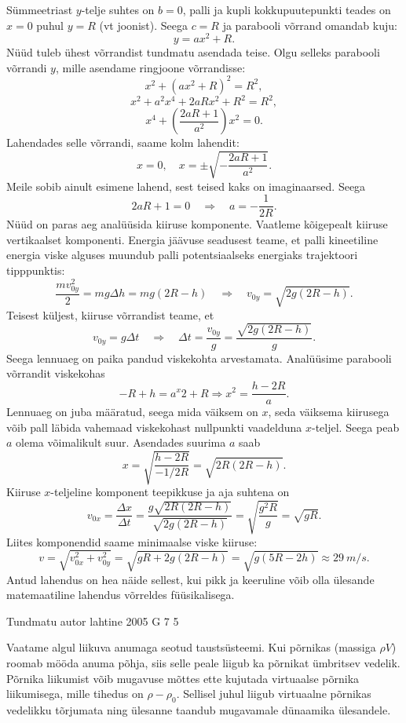 \documentclass[11pt, twoside]{article}
\begin{document}
{{Sümmeetriast $y$-telje suhtes on $b = 0$, palli ja kupli kokkupuutepunkti teades on $x = 0$ puhul $y = R$ (vt joonist). Seega $c = R$ ja parabooli võrrand omandab kuju:
\[
y = ax^2 + R.
\]
Nüüd tuleb ühest võrrandist tundmatu asendada teise. Olgu selleks parabooli võrrandi $y$, mille asendame ringjoone võrrandisse:
\[
x^{2}+\left(a x^{2}+R\right)^{2}=R^{2},
\]
\[
x^{2}+a^{2} x^{4}+2 a R x^{2}+R^{2}=R^{2},
\]
\[
x^{4}+\left(\frac{2 a R+1}{a^{2}}\right) x^{2}=0.
\]
Lahendades selle võrrandi, saame kolm lahendit:
\[
x=0, \quad x=\pm \sqrt{-\frac{2 a R+1}{a^{2}}}.
\]
Meile sobib ainult esimene lahend, sest teised kaks on imaginaarsed. Seega
\[
2aR + 1 = 0 \quad\Rightarrow\quad a = - \frac{1}{2R}.
\]
Nüüd on paras aeg analüüsida kiiruse komponente. Vaatleme kõigepealt kiiruse vertikaalset komponenti. Energia jäävuse seadusest teame, et palli kineetiline energia viske alguses muundub palli potentsiaalseks energiaks trajektoori tipppunktis:
\[
\frac{m v_{0 y}^{2}}{2}=m g \Delta h=m g(2 R-h) \quad\Rightarrow\quad v_{0 y}=\sqrt{2 g(2 R-h)}.
\]
Teisest küljest, kiiruse võrrandist teame, et
\[
v_{0 y}=g \Delta t \quad \Rightarrow \quad \Delta t=\frac{v_{0 y}}{g}=\frac{\sqrt{2 g(2 R-h)}}{g}.
\]
Seega lennuaeg on paika pandud viskekohta arvestamata. Analüüsime parabooli võrrandit viskekohas
\[
-R + h = a^x2 + R \Rightarrow x^2 = \frac{h-2R}{a}.
\]
Lennuaeg on juba määratud, seega mida väiksem on $x$, seda väiksema kiirusega võib pall läbida vahemaad viskekohast nullpunkti vaadelduna $x$-teljel. Seega peab $a$ olema võimalikult suur. Asendades suurima $a$ saab
\[
x=\sqrt{\frac{h-2 R}{-1 / 2 R}}=\sqrt{2 R(2 R-h)}.
\]
Kiiruse $x$-teljeline komponent teepikkuse ja aja suhtena on
\[
v_{0 x}=\frac{\Delta x}{\Delta t}=\frac{g \sqrt{2 R(2 R-h)}}{\sqrt{2 g(2 R-h)}}=\sqrt{\frac{g^{2} R}{g}}=\sqrt{g R}.
\]
Liites komponendid saame minimaalse viske kiiruse:
\[
v=\sqrt{v_{0 x}^{2}+v_{0 y}^{2}}=\sqrt{g R+2 g(2 R-h)}=\sqrt{g(5 R-2 h)} \approx \SI{29}{m/s}.
\]
Antud lahendus on hea näide sellest, kui pikk ja keeruline võib olla ülesande matemaatiline lahendus võrreldes füüsikalisega.
\fi
}

{Tundmatu autor} %
{lahtine} %
{2005} %
{G 7} %
{5} %
{

\ifSolution
Vaatame algul liikuva anumaga seotud taustsüsteemi. Kui põrnikas (massiga $\rho V$) roomab mööda anuma põhja, siis selle peale liigub ka põrnikat ümbritsev vedelik. Põrnika liikumist võib mugavuse mõttes ette kujutada virtuaalse põrnika liikumisega, mille tihedus on $\rho - \rho_0$. Sellisel juhul liigub virtuaalne põrnikas vedelikku tõrjumata ning ülesanne taandub mugavamale dünaamika ülesandele.

}}
\end{document}
